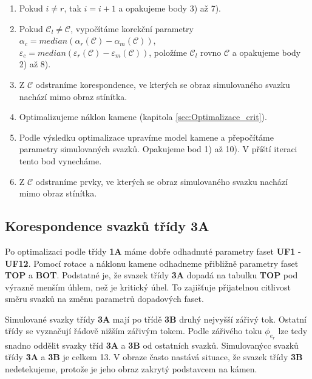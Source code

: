 \begin{enumerate}
\item Pokud $i \neq r$, tak $i = i+1$ a opakujeme body 3) až 7).

\item Pokud $\mathcal{C}_{l} \neq \mathcal{C}$, vypočítáme korekční parametry $\alpha_{c} = median(\alpha_{r}(\mathcal{C})-\alpha_{m}(\mathcal{C}))$, \\ $\varepsilon_{c} = median(\varepsilon_{r}(\mathcal{C})-\varepsilon_{m}(\mathcal{C}))$, položíme $\mathcal{C}_{l}$ rovno $\mathcal{C}$  a opakujeme body 2) až 8).

\item Z $\mathcal{C}$ odstraníme korespondence, ve kterých se obraz simulovaného svazku nachází mimo obraz stínítka.

\item Optimalizujeme náklon kamene (kapitola \ref{sec:Optimalizace_crit}).

\item Podle výsledku optimalizace upravíme model kamene a přepočítáme parametry simulovaných svazků. Opakujeme bod 1) až 10). V příští iteraci tento bod vynecháme. 

\item Z $\mathcal{C}$ odstraníme prvky, ve kterých se obraz simulovaného svazku nachází mimo obraz stínítka.

\end{enumerate}
\newpage
\subsection{Korespondence svazků třídy \textbf{3A}}	
\label{sec:3A}
	Po optimalizaci podle třídy \textbf{1A} máme dobře odhadnuté parametry faset \textbf{UF1} - \textbf{UF12}. Pomocí rotace a náklonu kamene odhadneme přibližně parametry faset \textbf{TOP} a \textbf{BOT}. Podstatné je, že svazek třídy \textbf{3A} dopadá na tabulku \textbf{TOP} pod výrazně menším úhlem, než je kritický úhel. To zajišťuje přijatelnou citlivost směru svazků na změnu parametrů dopadových faset. 
	
	Simulované svazky třídy \textbf{3A} mají po třídě \textbf{3B} druhý nejvyšší zářivý tok. Ostatní třídy se vyznačují řádově nižším zářivým tokem. Podle zářivého toku $\phi_{e_r}$ lze tedy snadno oddělit svazky tříd \textbf{3A} a \textbf{3B} od ostatních svazků. Simulovanýcc svazků třídy \textbf{3A} a \textbf{3B} je celkem 13. V obraze často nastává situace, že svazek třídy \textbf{3B} nedetekujeme, protože je jeho obraz zakrytý podstavcem na kámen.
	
